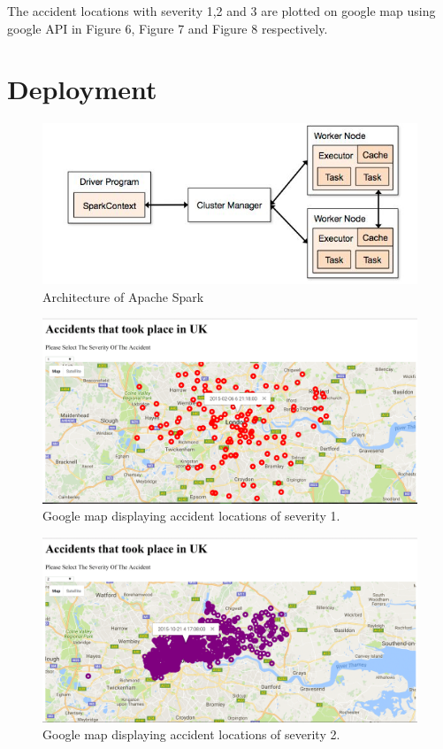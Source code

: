 \documentclass{acm_proc_article-sp}
\begin{document}
The accident locations with severity 1,2 and 3 are plotted on google map using google API in Figure 6, Figure 7 and Figure 8 respectively. 



\section{Deployment}

\begin{figure}
      \includegraphics[width=1.0\columnwidth]{images/sparkarchitecture.JPG}
  \caption{Architecture of Apache Spark}
\end{figure}

\begin{figure}
  \centering
      \includegraphics[width=1.0\textwidth]{images/googlemap.png}
  \caption{Google map displaying accident locations of severity 1.}
\end{figure}


\begin{figure}
  \centering
      \includegraphics[width=1.0\textwidth]{images/googlemap2.png}
  \caption{Google map displaying accident locations of severity 2.}
\end{figure}
\end{document}
